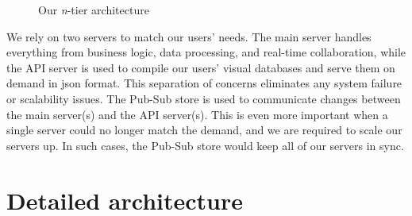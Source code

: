 \begin{toexclude}
\begin{figure}[H]

    \caption{Our \emph{n}-tier architecture}
    \label{fig:ntier-arch}
  \end{figure}

  We rely on two servers to match our users' needs. The main server handles everything from business logic, data processing, and real-time collaboration, while the API server is used to compile our users' visual databases and serve them on demand in \acrshort{json} format.
  This separation of concerns eliminates any system failure or scalability issues.
  The Pub-Sub store is used to communicate changes between the main server(s) and the API server(s).
  This is even more important when a single server could no longer match the demand, and we are required to scale our servers up.
  In such cases, the Pub-Sub store would keep all of our servers in sync.


  \section{Detailed architecture}


\end{toexclude}
